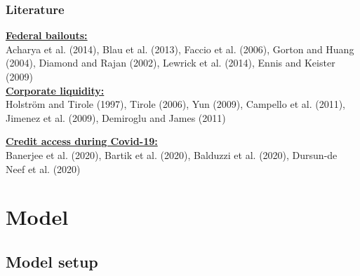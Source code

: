 \documentclass[13.8pt]{beamer}
\begin{document}
\begin{frame}
\frametitle{Literature}
\textbf{\large\underline{Federal bailouts:}}\\ 
Acharya et al. (2014), Blau et al. (2013), Faccio et al. (2006), Gorton and Huang (2004), Diamond and Rajan (2002), Lewrick et al. (2014), Ennis and Keister (2009) \\
\vspace{0.5cm}
\textbf{\large\underline{Corporate liquidity:}}\\
Holström and Tirole (1997), Tirole (2006), Yun (2009), Campello et al. (2011), Jimenez et al. (2009), Demiroglu and James (2011)


\vspace{1cm}
\textbf{\large\underline{Credit access during Covid-19:}}\\
Banerjee et al. (2020), Bartik et al. (2020), Balduzzi et al. (2020), Dursun-de Neef et al. (2020)


\end{frame}




\section{Model}
\subsection{Model setup}
\end{document}
